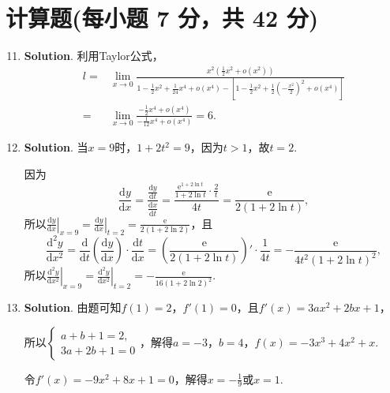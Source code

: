 \documentclass[../main.tex]{subfiles}
\begin{document}
\section{计算题(每小题 7 分，共 42 分)}
\begin{enumerate}
    \setcounter{enumi}{10}
    \item \textbf{Solution}. 利用Taylor公式，
          \[
              \begin{aligned}
                  l= {} & \lim_{x\to0}\frac{x^2\left(\frac{1}{2}x^2+o(x^2)\right)}{1-\frac{1}{2}x^2+\frac{1}{24}x^4+o(x^4)-\left[1-\frac{1}{2}x^2+\frac{1}{2}\left(-\frac{x^2}{2}\right)^2+o(x^4)\right]} \\
                  = {}  & \lim_{x\to0}\frac{-\frac{1}{2}x^4+o(x^4)}{-\frac{1}{12}x^4+o(x^4)}=6.
              \end{aligned}
          \]

    \item \textbf{Solution}. 当$x=9$时，$1+2t^{2}=9$，因为$t>1$，故$t=2$.

          因为
          \[\frac{\mathrm{d}y}{\mathrm{d}x}=\frac{\frac{\mathrm{d}y}{\mathrm{d}t}}{\frac{\mathrm{d}x}{\mathrm{d}t}}
              =\frac{\frac{\mathrm{e}^{1+2\ln t}}{1+2\ln t}\cdot\frac{2}{t}}{4t}=\frac{\mathrm{e}}{2(1+2\ln
                  t)},
          \]
          所以$\left.\frac{\mathrm{d}y}{\mathrm{d}x}\right|_{x=9}=\left.\frac{\mathrm{d}y}{\mathrm{d}x}
              \right|_{t=2}=\frac{\mathrm{e}}{2(1+2\ln 2)}$，且
          \[
              \frac{\mathrm{d}^{2}y}{\mathrm{d}x^{2}}=\frac{\mathrm{d}}{\mathrm{d}t}\left
              (\frac{\mathrm{d}y}{\mathrm{d}x}\right)\cdot\frac{\mathrm{d}t}{\mathrm{d}x}
              =\left(\frac{\mathrm{e}}{2(1+2\ln t)}\right)'\cdot\frac{1}{4t}=-\frac{\mathrm{e}}{4t^{2}(1+2\ln
                      t)^{2}},
          \]
          所以$\left.\frac{\mathrm{d}^{2}y}{\mathrm{d}x^{2}}\right|_{x=9}=\left.\frac{\mathrm{d}^{2}y}{\mathrm{d}x^{2}}
              \right|_{t=2}=-\frac{\mathrm{e}}{16(1+2\ln 2)^{2}}$.

    \item \textbf{Solution}. 由题可知$f(1)=2$，$f'(1)=0$，且$f'(x)=3ax^{2}+2
              bx+1$，

          所以$\begin{cases}
                  a+b+1=2, \\
                  3a+2b+1=0
              \end{cases}$，解得$a=-3$，$b=4$，$f(x)=-3x^{3}+4x^{2}+x$.

          令$f'(x)=-9x^{2}+8x+1=0$，解得$x=-\frac{1}{9}$或$x=1$.


\end{enumerate}
\end{document}
